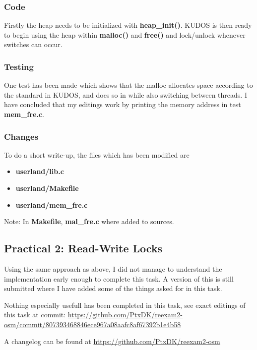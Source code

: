 \documentclass[11pt,a4paper]{article}
\theoremstyle{plain}
\theoremstyle{definition}
\theoremstyle{remark}
\numberwithin{equation}{section}
\begin{document}
\subsubsection*{Code}

Firstly the heap needs to be initialized with \textbf{heap\_init()}. KUDOS is then ready to begin using the heap within \textbf{malloc()} and \textbf{free()} and lock/unlock whenever switches can occur.


\subsubsection*{Testing}

One test has been made which shows that the malloc allocates space according to the standard in KUDOS, and does so in while also switching between threads. I have concluded that my editings work by printing the memory address in test \textbf{mem\_fre.c}.

\subsubsection*{Changes}

To do a short write-up, the files which has been modified are
\begin{itemize}
    \item \textbf{userland/lib.c}
    \item \textbf{userland/Makefile}
    \item \textbf{userland/mem\_fre.c}
\end{itemize}

Note: In \textbf{Makefile}, \textbf{mal\_fre.c} where added to sources.

\subsection*{Practical 2: Read-Write Locks}

Using the same approach as above, I did not manage to understand the implementation early enough to complete this task. A version of this is still submitted where I have added some of the things asked for in this task.

Nothing especially usefull has been completed in this task, see exact editings of this task at commit:  \url{https://github.com/PtxDK/reexam2-osm/commit/807393468846ece967a08aafc8af67392b1e4b58}

A changelog can be found at \url{https://github.com/PtxDK/reexam2-osm}
\end{document}
